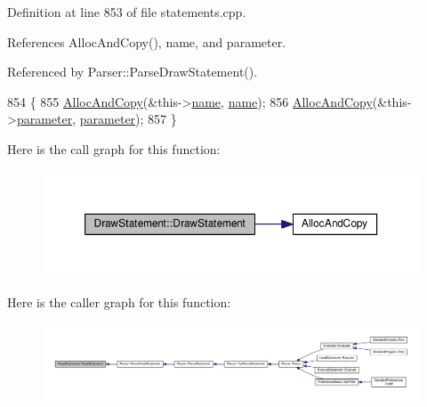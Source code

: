 Definition at line 853 of file statements.\+cpp.



References Alloc\+And\+Copy(), name, and parameter.



Referenced by Parser\+::\+Parse\+Draw\+Statement().


\begin{DoxyCode}
854 \{
855     \hyperlink{clib_8h_a5bed05c70cb17e541fee570b5dc32e1a}{AllocAndCopy}(&this->\hyperlink{classDrawStatement_a3f94d0d8039a4a683bc0631fc27c6f4c}{name}, \hyperlink{classDrawStatement_a3f94d0d8039a4a683bc0631fc27c6f4c}{name});
856     \hyperlink{clib_8h_a5bed05c70cb17e541fee570b5dc32e1a}{AllocAndCopy}(&this->\hyperlink{classDrawStatement_a56f4d974e2408e03e1722c319238e7cf}{parameter}, \hyperlink{classDrawStatement_a56f4d974e2408e03e1722c319238e7cf}{parameter});
857 \}
\end{DoxyCode}


Here is the call graph for this function\+:\nopagebreak
\begin{figure}[H]
\begin{center}
\leavevmode
\includegraphics[width=350pt]{classDrawStatement_a370abbf650f311ecbcc9ff5faf9a451c_cgraph}
\end{center}
\end{figure}




Here is the caller graph for this function\+:\nopagebreak
\begin{figure}[H]
\begin{center}
\leavevmode
\includegraphics[width=350pt]{classDrawStatement_a370abbf650f311ecbcc9ff5faf9a451c_icgraph}
\end{center}
\end{figure}


